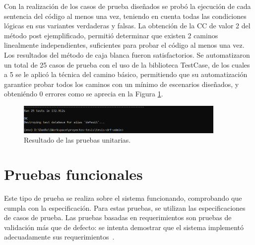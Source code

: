 Con la realización de los casos de prueba diseñados se probó la ejecución de cada sentencia del código al
menos una vez, teniendo en cuenta todas las condiciones lógicas en sus variantes verdaderas y falsas. La
obtención de la CC de valor 2 del método post ejemplificado, permitió determinar que existen 2 caminos
linealmente independientes, suficientes para probar el código al menos una vez.
Los resultados del método de caja blanca fueron satisfactorios. Se automatizaron un total de 25 casos de
prueba con el uso de la biblioteca TestCase, de los cuales a 5 se le aplicó la técnica del camino básico, permitiendo que su automatización garantice probar todos los caminos con un mínimo de escenarios diseñados,
y obteniéndo 0 errores como se aprecia en la Figura \ref{fig:unit_test}.

\begin{figure}[htbp] %
	\centering
	\includegraphics[width=0.9\textwidth]{images/TestCase.PNG} 
	\caption{Resultado de las pruebas unitarias.}
	\label{fig:unit_test}
\end{figure}

\section{Pruebas funcionales}

Este tipo de prueba se realiza sobre el sistema funcionando, comprobando que cumpla con la especificación. Para estas pruebas, se utilizan las especificaciones de casos de prueba. Las pruebas basadas en requerimientos son pruebas de validación más que de defecto: se intenta demostrar que el sistema implementó adecuadamente sus requerimientos~\cite{sommerville2011software}.

